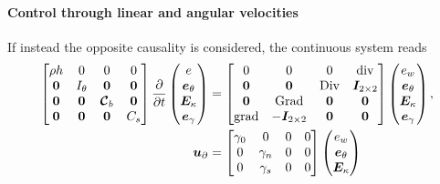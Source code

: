\paragraph{Control through linear and angular velocities} If instead the opposite causality is considered, the continuous system reads
\begin{subequations}\label{eq:phlinsys_Min2}
	\begin{align}
	\begin{bmatrix}
	\rho h  & 0  & 0  & 0 \\
	\bm{0} & I_\theta &  \bm{0} & \bm{0}\\
	\bm{0}  & \bm{0}  & \bm{\mathcal{C}}_b  & \bm{0}\\
	\bm{0} & \bm{0} &  \bm{0} & C_s \\
	\end{bmatrix}
	\diffp{}{t}
	\begin{pmatrix}
	e \\
	\bm{e}_\theta \\
	\bm{E}_\kappa \\
	\bm{e}_{\gamma} \\
	\end{pmatrix} &= 
	\begin{bmatrix}
	0  & 0  & 0  & \div \\
	\bm{0} & \bm{0} &  \Div & \bm{I}_{2 \times 2}\\
	\bm{0}  & \Grad  & \bm{0}  & \bm{0}\\
	\grad & -\bm{I}_{2 \times 2} &  \bm{0} & \bm{0} \\
	\end{bmatrix}
	\begin{pmatrix}
	e_w \\
	\bm{e}_{\theta} \\
	\bm{E}_{\kappa} \\
	\bm{e}_{\gamma} \\
	\end{pmatrix},  \label{eq:pHdyn_Min2}  \\
	\bm{u}_\partial &= 
	\begin{bmatrix}
	\gamma_{0} & {0} & {0} & {0} \\
	{0} & \gamma_{n} & {0} & {0} \\
	{0} & \gamma_{s} & {0} & {0} \\
	\end{bmatrix}
	\begin{pmatrix}
	e_w \\
	\bm{e}_{\theta} \\
	\bm{E}_{\kappa} \\

\end{pmatrix}
\end{align}
\end{subequations}
